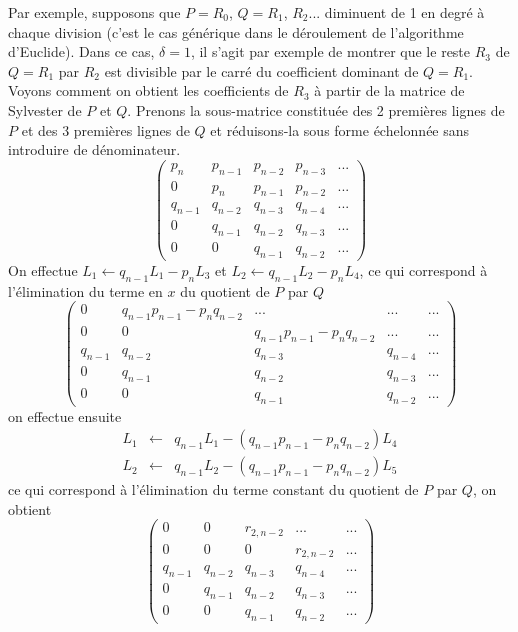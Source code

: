 \documentclass[a4paper,11pt]{article}
\begin{document}
Par exemple, supposons que $P=R_0$, $Q=R_1$, $R_2$... diminuent de 1 en degr\'e
\`a chaque division 
(c'est le cas g\'en\'erique dans le d\'eroulement de l'algorithme
d'Euclide). Dans ce cas, $\delta=1$, il s'agit par exemple
de montrer que le reste $R_3$ de $Q=R_1$ par $R_2$ est divisible par le
carr\'e du coefficient dominant de $Q=R_1$.
Voyons comment on obtient les coefficients de $R_3$
\`a partir de la matrice de Sylvester de $P$ et $Q$. 
Prenons la sous-matrice constitu\'ee des 2 premi\`eres lignes de $P$
et des 3 premi\`eres lignes de $Q$ et r\'eduisons-la sous forme
\'echelonn\'ee sans introduire de d\'enominateur. 
\[
\left( \begin{array}{ccccc}
p_n & p_{n-1} & p_{n-2} & p_{n-3} & ... \\
0 & p_n & p_{n-1} & p_{n-2} &  ... \\
q_{n-1} & q_{n-2} & q_{n-3} & q_{n-4} & ... \\
0 & q_{n-1} & q_{n-2} & q_{n-3} & ... \\
0 & 0 & q_{n-1} & q_{n-2} &  ...  
\end{array} 
\right)
\]
On effectue $L_1 \leftarrow q_{n-1} L_1 - p_n L_3$
et $L_2 \leftarrow q_{n-1} L_2 - p_n L_4$, ce qui correspond \`a
l'\'elimination du terme en $x$ du quotient de $P$ par $Q$
\[
\left( \begin{array}{ccccc}
0 & q_{n-1} p_{n-1} - p_n q_{n-2}  & ... & ... & ... \\
0 & 0 & q_{n-1} p_{n-1} - p_n q_{n-2} & ... &  ... \\
q_{n-1} & q_{n-2} & q_{n-3} & q_{n-4} & ... \\
0 & q_{n-1} & q_{n-2} & q_{n-3} & ... \\
0 & 0 & q_{n-1} & q_{n-2} &  ...  
\end{array} 
\right)
\]
on effectue ensuite 
\begin{eqnarray*}
L_1 & \leftarrow &q_{n-1} L_1 - (q_{n-1} p_{n-1} - p_n q_{n-2})  L_4 \\
L_2 & \leftarrow & q_{n-1} L_2 - (q_{n-1} p_{n-1} - p_n q_{n-2})  L_5
\end{eqnarray*} 
ce qui correspond \`a l'\'elimination du terme constant du quotient
de $P$ par $Q$, on obtient
\[
\left( \begin{array}{ccccc}
0 & 0 & r_{2,n-2} & ... & ... \\
0 & 0 & 0 & r_{2,n-2} &  ... \\
q_{n-1} & q_{n-2} & q_{n-3} & q_{n-4} & ... \\
0 & q_{n-1} & q_{n-2} & q_{n-3} & ... \\
0 & 0 & q_{n-1} & q_{n-2} &  ...  
\end{array} 
\right)
\]
\end{document}
